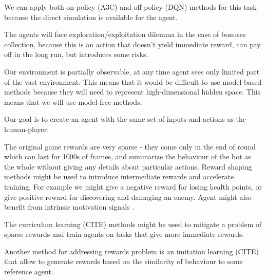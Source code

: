 
We can apply both on-policy (A3C) and off-policy (DQN) methods for this task because the direct simulation is available for the agent.

The agents will face exploration/exploitation dilemma in the case of bonuses collection, because this is an action that doesn't yield immediate reward, can pay off in the long run, but introduces some risks.

Our environment is partially observable, at any time agent sees only limited part of the vast environment. This means that it would be difficult to use model-based methods because they will need to represent high-dimensional hidden space. This means that we will use model-free methods.

Our goal is to create an agent with the same set of inputs and actions as the human-player.


The original game rewards are very sparse - they come only in the end of round which can last for 1000s of frames, and summarize the behaviour of the bot as the whole without giving any details about particular actions.
Reward shaping \cite{RewardShaping} methods might be used to introduce intermediate rewards and accelerate training. For example we might give a negative reward for losing health points, or give positive reward for discovering and damaging an enemy.
Agent might also benefit from intrinsic motivation signals \cite{IntrinsicMotivation}.


The curriculum learning (CITE) methods might be used to mitigate a problem of sparse rewards and train agents on tasks that give more immediate rewards.

Another method for addressing rewards problem is an imitation learning (CITE) that allow to generate rewards based on the similarity of behaviour to some reference agent.

